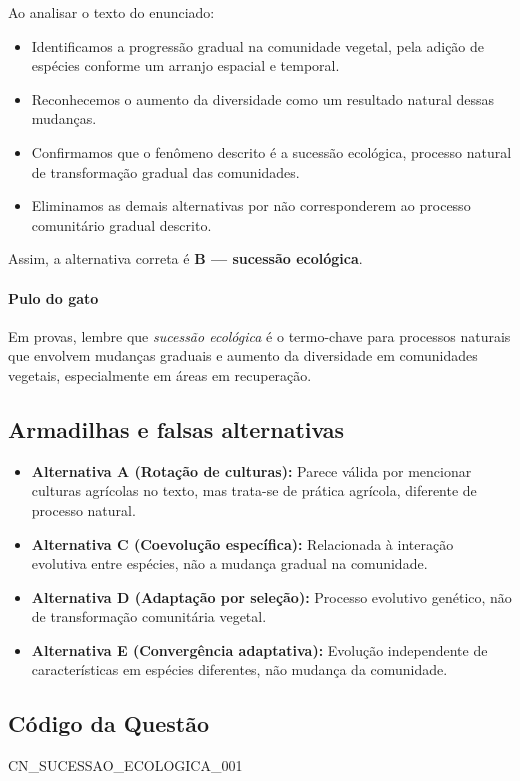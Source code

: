 \documentclass{article}
\begin{document}
Ao analisar o texto do enunciado:
\begin{itemize}
  \item Identificamos a progressão gradual na comunidade vegetal, pela adição de espécies conforme um arranjo espacial e temporal.
  \item Reconhecemos o aumento da diversidade como um resultado natural dessas mudanças.
  \item Confirmamos que o fenômeno descrito é a sucessão ecológica, processo natural de transformação gradual das comunidades.
  \item Eliminamos as demais alternativas por não corresponderem ao processo comunitário gradual descrito.
\end{itemize}

Assim, a alternativa correta é \textbf{B — sucessão ecológica}.

\paragraph{Pulo do gato}
Em provas, lembre que \textit{sucessão ecológica} é o termo-chave para processos naturais que envolvem mudanças graduais e aumento da diversidade em comunidades vegetais, especialmente em áreas em recuperação.

\subsection*{Armadilhas e falsas alternativas}

\begin{itemize}
  \item \textbf{Alternativa A (Rotação de culturas):} Parece válida por mencionar culturas agrícolas no texto, mas trata-se de prática agrícola, diferente de processo natural.
  \item \textbf{Alternativa C (Coevolução específica):} Relacionada à interação evolutiva entre espécies, não a mudança gradual na comunidade.
  \item \textbf{Alternativa D (Adaptação por seleção):} Processo evolutivo genético, não de transformação comunitária vegetal.
  \item \textbf{Alternativa E (Convergência adaptativa):} Evolução independente de características em espécies diferentes, não mudança da comunidade.
\end{itemize}

\subsection*{Código da Questão}

CN_SUCESSAO_ECOLOGICA_001
\end{document}
